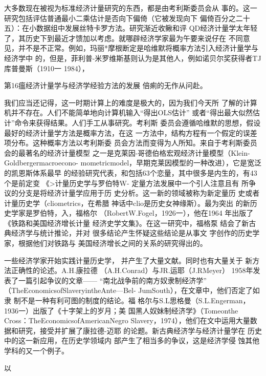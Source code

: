 大多数现在被视为标准经济计量研究的东西，都是由考利斯委员会从
事的。这一研究包括评估普通最小二乘估计是否向下偏倚（它被发现向下
偏倚百分之二十五）：在小数据组中发展丝特卡罗方法。研究渐近收鳅和评
QD经济计量学太年轻了，其历史下到最近才馈加以考虑。就哪辟经济学家最为午要来说仔在
不同意见，并不是不正常。例如，玛丽*摩根断定是哈维默将概率方法引入经济计量学与经济学中
的，但是，菲利普-米罗维斯基则认为是其他人，例如诺贝尔奖获得者TJ库普曼斯（1910一
1984），

第16瘟经济计量学与经济学经验方法的发展
倍痢的无作从问赴。

我们应当还记得，这一时期计算上的难度是极大的，因为我们今天所
了解的计算机并不存在。人们不能简单地向计算机输入“得出OLS估计”
或者“得出最大似然估计”命令来获得结果。人们手工从事研究。考利斯
委员会遵循哈维默的思想，假设最好的经济计量学方法是概率方法，在这
一方法中，结构方程有一个假定的误差项分布。这种概率方法以考利斯委
员会方法而变得为人所知。来自于考利斯委员会的最著名的经济计量模型
之一是克莱因-哥德伯格宏观经济计量模型（Klein-Goldbergermacroecono-
mometricmodel，早期克莱因模型的一种改进），它是宽泛的凯恩斯体系最早
的经验研究代表，和包括63个恋量，其中很多是内生的，有43个是前定变
《>计量历史学与罗伯特W-
定量方法发展中一个引人注意且有
所争议的分支是将经济计量学应用于历
史分析。这一新的领域被称为新定量历
史或者计量历史学（cliometrics，在希腊
神话中clio是历史女神缘斯）。最为突出
的新历史学家是罗伯特，入，福格尔
（RobertW.Fogel，1926一），他在1964
年出版了《铁路和美国经济增长计量
经济史学文集》。在这一研究中，福格泵
结会了新古典经济学与统计推论，并对
很多结论产生怀疑这些结论是从事文
字创作的历史学家，根据他们对铁路与
美国经济增长之间的关系的研究得出的。

一些经济学家开始实践计量历史学，
并产生了大量文献。同时也有大量关于
新方法正确性的论述。A.H.康拉德
（A.H.Conrad）与JR.运耶（J.RMeyer）
1958年发表了一篇引起争议的文章——
“南北战争前的南方奴隶制经济学”
（TheEconomicsofSlaveryintheAnte—Bel-
JumSouth），在文章中，他们否定了如隶
制不是一种有利可图的制度的结论。福
格尔与S.L思格曼（S.L.Engerman，
1936一）出版了《十字架上的岁月；美
国黑人奴妹制经济学》（Tomeonthe
Cross：TheEconomicsofAmericanNegro
Slavery，1974），他们在文中运用大量数
据和研究，接受并扩展了康拉德-迈耶
的论题。新古典经济学与经济计量学在
历史中的这一新应用，在历史学领域内
部产生了相当多的争议，这是经济学侵
蚀其他学科的又一个例子。

以

